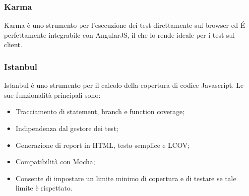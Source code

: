 \subsubsection{Karma}
Karma è uno strumento per l'esecuzione dei test direttamente sul browser ed \'E perfettamente integrabile con AngularJS, il che lo rende ideale per i test sul client.


\subsubsection{Istanbul}
\label{Istabull}
Istanbul è uno strumento per il calcolo della copertura di codice Javascript. Le sue funzionalità principali sono:
\begin{itemize}
\item Tracciamento di statement, branch e function coverage;
\item Indipendenza dal gestore dei test;
\item Generazione di report in HTML, testo semplice e LCOV;
\item Compatibilità con Mocha;
\item Consente di impostare un limite minimo di copertura e di testare se tale limite è rispettato.
\end{itemize}



